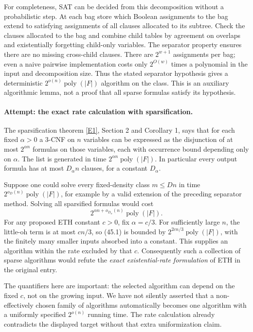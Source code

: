 \documentclass[11pt,a4paper]{article}
\newcommand{\eref}[2]{\hyperlink{extra:#1:#2}{[E#2]}}
\numberwithin{equation}{section}
\begin{document}
For completeness, SAT can be decided from this decomposition without a
probabilistic step. At each bag store which Boolean assignments to the
bag extend to satisfying assignments of all clauses allocated to its
subtree. Check the clauses allocated to the bag and combine child tables
by agreement on overlaps and existentially forgetting child-only
variables. The separator property ensures there are no missing
cross-child clauses. There are $2^{w+1}$ assignments per bag; even a
naive pairwise implementation costs only $2^{O(w)}$ times a polynomial
in the input and decomposition size. Thus the stated separator hypothesis
gives a deterministic $2^{o(n)}\operatorname{poly}(|F|)$ algorithm on the
class. This is an auxiliary algorithmic lemma, not a proof that all
sparse formulas satisfy its hypothesis.

\paragraph{Attempt: the exact rate calculation with sparsification.}
The sparsification theorem \eref{statement}{1}, Section 2 and Corollary 1,
says that for each fixed $\alpha>0$ a $3$-CNF on $n$ variables can be
expressed as the disjunction of at most $2^{\alpha n}$ formulas on those
variables, each with occurrence bound depending only on $\alpha$.
The list is generated in time $2^{\alpha n}\operatorname{poly}(|F|)$.
In particular every output formula has at most $D_\alpha n$ clauses,
for a constant $D_\alpha$.

Suppose one could solve every fixed-density class $m\le Dn$ in time
$2^{o_D(n)}\operatorname{poly}(|F|)$, for example by a valid extension
of the preceding separator method. Solving all sparsified formulas would
cost
\[
 2^{\alpha n+o_{D_\alpha}(n)}\operatorname{poly}(|F|). \tag{45.1}
\]
For any proposed ETH constant $c>0$, fix $\alpha=c/3$. For sufficiently
large $n$, the little-oh term is at most $cn/3$, so (45.1) is bounded
by $2^{2cn/3}\operatorname{poly}(|F|)$, with the finitely many smaller
inputs absorbed into a constant. This supplies an algorithm within the
rate excluded by that $c$. Consequently such a collection of sparse
algorithms would refute the \emph{exact existential-rate formulation}
of ETH in the original entry.

The quantifiers here are important: the selected algorithm can depend
on the fixed $c$, not on the growing input. We have not silently asserted
that a non-effectively chosen family of algorithms automatically becomes
one algorithm with a uniformly specified $2^{o(n)}$ running time. The
rate calculation already contradicts the displayed target without that
extra uniformization claim.
\end{document}
